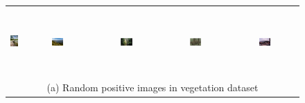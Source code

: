 \begin{figure}[th]
{\small{
\begin{center}
\begin{tabular}{@{}c@{\,\,\,}c@{\,\,\,}c@{\,\,\,}c@{\,\,\,}c@{\,\,\,}}
\includegraphics[height=1in]{imggrid/datasetposi/6.jpg} &
\includegraphics[width=0.19\textwidth]{imggrid/datasetposi/7.jpg} &
\includegraphics[width=0.19\textwidth]{imggrid/datasetposi/8.jpg} &
\includegraphics[width=0.19\textwidth]{imggrid/datasetposi/9.jpg} &
\includegraphics[width=0.19\textwidth]{imggrid/datasetposi/10.jpg} \\
\multicolumn{5}{c}{(a) Random positive images in vegetation dataset} \\ 

\end{tabular}
\end{center}}}
\end{figure}

